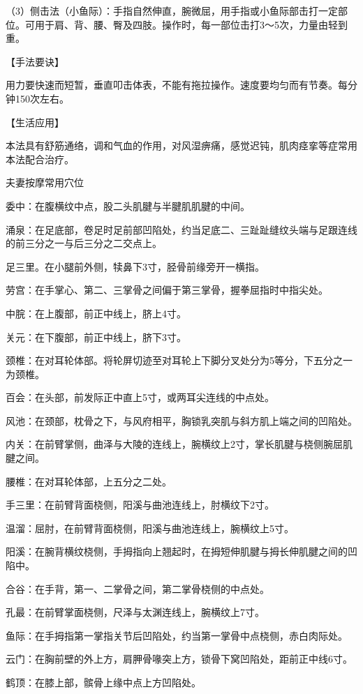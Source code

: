 \documentclass[12pt,UTF8,openany]{ctexbook}
\begin{document}
（3）侧击法（小鱼际）：手指自然伸直，腕微屈，用手指或小鱼际部击打一定部位。可用于肩、背、腰、臀及四肢。操作时，每一部位击打3～5次，力量由轻到重。

【手法要诀】

用力要快速而短暂，垂直叩击体表，不能有拖拉操作。速度要均匀而有节奏。每分钟150次左右。

【生活应用】

本法具有舒筋通络，调和气血的作用，对风湿痹痛，感觉迟钝，肌肉痉挛等症常用本法配合治疗。





夫妻按摩常用穴位


委中：在腹横纹中点，股二头肌腱与半腱肌肌腱的中间。

涌泉：在足底部，卷足时足前部凹陷处，约当足底二、三趾趾缝纹头端与足跟连线的前三分之一与后三分之二交点上。

足三里。在小腿前外侧，犊鼻下3寸，胫骨前缘旁开一横指。

劳宫：在手掌心、第二、三掌骨之间偏于第三掌骨，握拳屈指时中指尖处。

中脘：在上腹部，前正中线上，脐上4寸。

关元：在下腹部，前正中线上，脐下3寸。

颈椎：在对耳轮体部。将轮屏切迹至对耳轮上下脚分叉处分为5等分，下五分之一为颈椎。

百会：在头部，前发际正中直上5寸，或两耳尖连线的中点处。

风池：在颈部，枕骨之下，与风府相平，胸锁乳突肌与斜方肌上端之间的凹陷处。

内关：在前臂掌侧，曲泽与大陵的连线上，腕横纹上2寸，掌长肌腱与桡侧腕屈肌腱之间。

腰椎：在对耳轮体部，上五分之二处。

手三里：在前臂背面桡侧，阳溪与曲池连线上，肘横纹下2寸。

温溜：屈肘，在前臂背面桡侧，阳溪与曲池连线上，腕横纹上5寸。

阳溪：在腕背横纹桡侧，手拇指向上翘起时，在拇短伸肌腱与拇长伸肌腱之间的凹陷中。

合谷：在手背，第一、二掌骨之间，第二掌骨桡侧的中点处。

孔最：在前臂掌面桡侧，尺泽与太渊连线上，腕横纹上7寸。

鱼际：在手拇指第一掌指关节后凹陷处，约当第一掌骨中点桡侧，赤白肉际处。

云门：在胸前壁的外上方，肩胛骨喙突上方，锁骨下窝凹陷处，距前正中线6寸。

鹤顶：在膝上部，髌骨上缘中点上方凹陷处。
\end{document}
